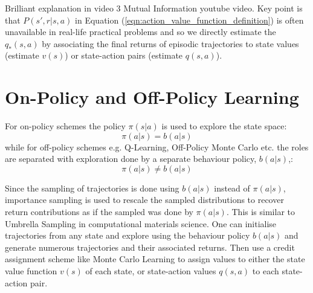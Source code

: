 \documentclass[a4paper,11pt]{article}
\begin{document}
Brilliant explanation in video 3 Mutual Information youtube video.  Key point is that $P(s',r|s,a)$ in Equation (\ref{eqn:action_value_function_definition}) is often unavailable in real-life practical problems and so we directly estimate the $q_*(s,a)$ by associating the final returns of episodic trajectories to state values (estimate $v(s)$) or state-action pairs (estimate $q(s,a)$).

\section{On-Policy and Off-Policy Learning}

For on-policy schemes the policy $\pi(s|a)$ is used to explore the state space:
\begin{equation} \label{eqn:on-policy-definition}
    \pi(a|s) = b(a|s)
\end{equation}
while for off-policy schemes e.g. Q-Learning, Off-Policy Monte Carlo etc. the roles are separated with exploration done by a separate behaviour policy, $b(a|s)$,:
\begin{equation} \label{eqn:off-policy-definition}
    \pi(a|s) \neq b(a|s)
\end{equation}

Since the sampling of trajectories is done using $b(a|s)$ instead of $\pi(a|s)$, importance sampling is used to rescale the sampled distributions to recover return contributions as if the sampled was done by $\pi(a|s)$.  This is similar to Umbrella Sampling in computational materials science.  One can initialise trajectories from any state and explore using the behaviour policy $b(a|s)$ and generate numerous trajectories and their associated returns.  Then use a credit assignment scheme like Monte Carlo Learning to assign values to either the state value function $v(s)$ of each state, or state-action values $q(s,a)$ to each state-action pair.
\end{document}
